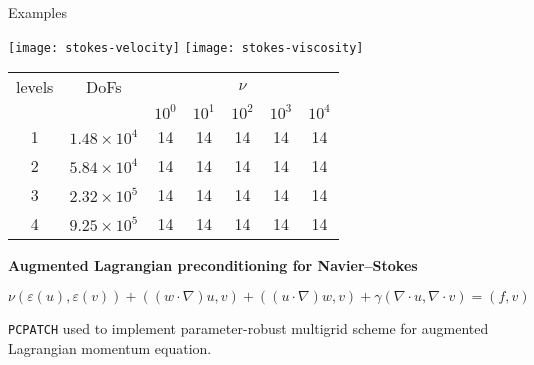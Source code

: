 \documentclass[paperwidth=60in,paperheight=36in,landscape]{baposter}
\begin{document}
\begin{poster}
\begin{posterbox}[name=examples, column=4, span=2, height=0.85]{Examples}
    \vspace{0.5\baselineskip}
    \begin{minipage}[c]{0.4\textwidth}
      \strut\vspace*{-\baselineskip}\newline
      {\centering \texttt{[image: stokes-velocity]}
        \texttt{[image: stokes-viscosity]}\par}
    \end{minipage}
    \hfill
    \hspace{0.5em}
    \begin{minipage}[c]{0.6\textwidth}
      \strut\vspace*{-\baselineskip}\newline
      \begin{tabular}{cc|ccccc}
        \toprule
        levels & DoFs & \multicolumn{5}{c}{$\nu$} \\
                  && $10^0$ & $10^1$ & $10^2$ & $10^3$ & $10^4$ \\
        \midrule
        1 & $1.48 \times 10^{4}$ & 14 & 14 & 14 & 14 & 14\\
        2 & $5.84 \times 10^{4}$ & 14 & 14 & 14 & 14 & 14\\
        3 & $2.32 \times 10^{5}$ & 14 & 14 & 14 & 14 & 14\\
        4 & $9.25 \times 10^{5}$ & 14 & 14 & 14 & 14 & 14\\
        \bottomrule
      \end{tabular}
    \end{minipage}

    \vspace{1.75\baselineskip}
    {\centering\Large\bfseries Augmented Lagrangian preconditioning for
      Navier--Stokes\strut\par}
    \vspace{-0.75\baselineskip}
    \begin{equation*}
      \nu (\varepsilon{(u)}, \varepsilon{(v)}) + ((w \cdot \nabla) u,
      v) + ((u \cdot \nabla)w, v) + \gamma(\nabla \cdot u, \nabla \cdot v) = (f, v)
    \end{equation*}

    {\raggedright \texttt{PCPATCH} used to implement parameter-robust multigrid scheme
    for augmented Lagrangian momentum equation.\par}


\end{posterbox}
\end{poster}
\end{document}
